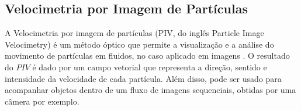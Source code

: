 \subsection{Velocimetria por Imagem de Partículas}

A Velocimetria por imagem de partículas (PIV, do inglês Particle Image Velocimetry) 
é um método óptico que permite a visualização e a análise do movimento de partículas em fluidos, no caso aplicado em imagens \cite{Bastiaans}.
O resultado do $PIV$ é dado por um campo vetorial que representa a direção, sentido e intensidade da velocidade de cada 
partícula. Além disso, pode ser usado para acompanhar objetos dentro de um fluxo de imagens sequenciais, obtidas por uma câmera por exemplo.

